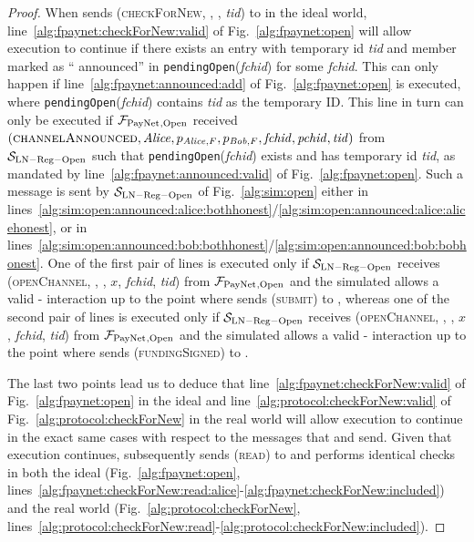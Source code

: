 \begin{proof}
  When \environment{} sends (\textsc{checkForNew}, \alice, \bob, \textit{tid}) to
  \alice{} in the ideal world, line~\ref{alg:fpaynet:checkForNew:valid} of
  Fig.~\ref{alg:fpaynet:open} will allow execution to continue if there exists
  an entry with temporary id \textit{tid} and member \alice{} marked as
  ``\alice{} announced'' in \texttt{pendingOpen}(\textit{fchid}) for some
  \textit{fchid}. This can only happen if line~\ref{alg:fpaynet:announced:add}
  of Fig.~\ref{alg:fpaynet:open} is executed, where
  \texttt{pendingOpen}(\textit{fchid}) contains \textit{tid} as the temporary
  ID. This line in turn can only be executed if $\mathcal{F}_{\mathrm{PayNet}}{}_{\mathrm{, Open}}$
  received $\left(\textsc{channelAnnounced}, \mathit{Alice}, p_{\mathit{Alice}, F}, p_{\mathit{Bob}, F},
  \mathit{fchid}, \mathit{pchid}, \mathit{tid}\right)$ from
  $\mathcal{S}_{\mathrm{LN - Reg - Open}}$ such that
  \texttt{pendingOpen}(\textit{fchid}) exists and has temporary id \textit{tid},
  as mandated by line~\ref{alg:fpaynet:announced:valid} of
  Fig.~\ref{alg:fpaynet:open}. Such a message is sent by $\mathcal{S}_{\mathrm{LN
  - Reg - Open}}$ of Fig.~\ref{alg:sim:open} either in
  lines~\ref{alg:sim:open:announced:alice:bothhonest}/\ref{alg:sim:open:announced:alice:alicehonest},
  or in
  lines~\ref{alg:sim:open:announced:bob:bothhonest}/\ref{alg:sim:open:announced:bob:bobhonest}.
  One of the first pair of lines is executed only if $\mathcal{S}_{\mathrm{LN -
  Reg - Open}}$ receives (\textsc{openChannel}, \alice, \bob, $x$,
  \textit{fchid}, \textit{tid}) from $\mathcal{F}_{\mathrm{PayNet}}{}_{\mathrm{, Open}}$ and the
  simulated \adversary{} allows a valid \alice-\bob{} interaction up to the
  point where \alice{} sends (\textsc{submit}) to \ledger, whereas one of the
  second pair of lines is executed only if $\mathcal{S}_{\mathrm{LN - Reg -
  Open}}$ receives (\textsc{openChannel}, \bob, \alice, $x$, \textit{fchid},
  \textit{tid}) from $\mathcal{F}_{\mathrm{PayNet}}{}_{\mathrm{, Open}}$ and the simulated
  \adversary{} allows a valid \alice-\bob{} interaction up to the point where
  \alice{} sends (\textsc{fundingSigned}) to \bob.

  The last two points lead us to deduce that
  line~\ref{alg:fpaynet:checkForNew:valid} of Fig.~\ref{alg:fpaynet:open} in the
  ideal and line~\ref{alg:protocol:checkForNew:valid} of
  Fig.~\ref{alg:protocol:checkForNew} in the real world will allow execution to
  continue in the exact same cases with respect to the messages that
  \environment{} and \adversary{} send. Given that execution continues,
  \alice{} subsequently sends (\textsc{read}) to \ledger{} and performs
  identical checks in both the ideal (Fig.~\ref{alg:fpaynet:open},
  lines~\ref{alg:fpaynet:checkForNew:read:alice}-\ref{alg:fpaynet:checkForNew:included})
  and the real world (Fig.~\ref{alg:protocol:checkForNew},
  lines~\ref{alg:protocol:checkForNew:read}-\ref{alg:protocol:checkForNew:included}).


\end{proof}
